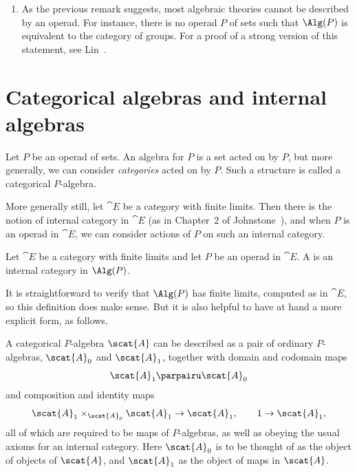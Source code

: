 \begin{remarks}
\begin{enumerate}
\item
As the previous remark suggests, most algebraic theories cannot be
described by an operad.  For instance, there is no operad $P$ of sets such
that $\Alg(P)$ is equivalent to the category of groups.%
%
%
% 
For a proof of a strong version of this statement, see Lin~\cite{LinAGA}.
\end{enumerate}
\end{remarks}


\section{Categorical algebras and internal algebras}


Let $P$ be an operad of sets.  An algebra for $P$ is a set acted on by $P$,
but more generally, we can consider \emph{categories} acted on by $P$.
Such a structure is called a categorical $P$-algebra.  

More generally still, let $\cat{E}$ be a category with finite limits.  Then
there is the notion of internal category in $\cat{E}$ (as in Chapter~2 of
Johnstone~\cite{JohnTT}), and when $P$ is an operad in
$\cat{E}$, we can consider actions of $P$ on such an internal category.


\begin{defn}
Let $\cat{E}$ be a category with finite limits and let $P$ be an operad in
$\cat{E}$.  A  is an internal category in $\Alg(P)$.
\end{defn}

It is straightforward to verify that $\Alg(P)$ has finite limits, computed
as in $\cat{E}$, so this definition does make sense.  But it is also
helpful to have at hand a more explicit form, as follows.

A categorical $P$-algebra $\scat{A}$ can be described as a
pair of ordinary $P$-algebras, $\scat{A}_0$ and
$\scat{A}_1$, together with domain and codomain maps
\[
\scat{A}_1 \parpairu \scat{A}_0
\]
and composition and identity maps
\[
\scat{A}_1 \times_{\scat{A}_0} \scat{A}_1 \to \scat{A}_1,
\qquad
1 \to \scat{A}_1,
\]
all of which are required to be maps of $P$-algebras, as well as obeying
the usual axioms for an internal category.  Here $\scat{A}_0$ is to be
thought of as the object of objects of $\scat{A}$, and $\scat{A}_1$ as the
object of maps in $\scat{A}$.

